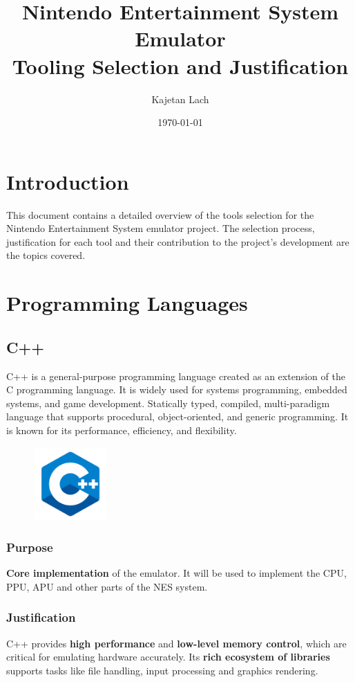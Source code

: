 \documentclass[a4paper, 11pt]{article}
\title{%
\vspace{-4.5cm}
\textbf{Nintendo Entertainment System Emulator}\\
Tooling Selection and Justification
}
\date{\today}
\author{Kajetan Lach}
\begin{document}
\maketitle

\section{Introduction}
This document contains a detailed overview of the tools selection for the Nintendo Entertainment System emulator project. The selection process, justification for each tool and their contribution to the project's development are the topics covered.

\section{Programming Languages}

\subsection{C++}
C++ is a general-purpose programming language created as an extension of the C programming language. It is widely used for systems programming, embedded systems, and game development. Statically typed, compiled, multi-paradigm language that supports procedural, object-oriented, and generic programming. It is known for its performance, efficiency, and flexibility.

\begin{figure}[h]
    \centering
    \includegraphics[width=0.25\textwidth]{cplusplus.png}
\end{figure}


\subsubsection{Purpose}
\textbf{Core implementation} of the emulator. It will be used to implement the CPU, PPU, APU and other parts of the NES system.

\subsubsection{Justification}
C++ provides \textbf{high performance} and \textbf{low-level memory control}, which are critical for emulating hardware accurately. Its \textbf{rich ecosystem of libraries} supports tasks like file handling, input processing and graphics rendering.
\end{document}
